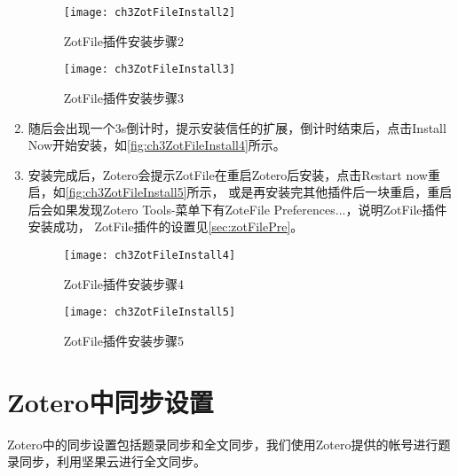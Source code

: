 \documentclass[cn,11pt,chinese]{elegantbook}
\begin{document}
\begin{enumerate}
			\begin{figure}[htbp]
				\begin{minipage}[t]{0.6\linewidth}
					\centering
					\texttt{[image: ch3ZotFileInstall2]}
					\caption{ZotFile插件安装步骤2}
					\label{fig:ch3ZotFileInstall2}
				\end{minipage}
				\begin{minipage}[t]{0.3\linewidth}
					\centering
					\texttt{[image: ch3ZotFileInstall3]}
					\caption{ZotFile插件安装步骤3}
					\label{fig:ch3ZotFileInstall3}
				\end{minipage}
			\end{figure}
			\item
			随后会出现一个3s倒计时，提示安装信任的扩展，倒计时结束后，点击Install Now开始安装，如\autoref{fig:ch3ZotFileInstall4}所示。
			\item
			安装完成后，Zotero会提示ZotFile在重启Zotero后安装，点击Restart now重启，如\autoref{fig:ch3ZotFileInstall5}所示，
			或是再安装完其他插件后一块重启，重启后会如果发现Zotero Tools-菜单下有ZoteFile Preferences...，说明ZotFile插件安装成功，
			ZotFile插件的设置见\cref{sec:zotFilePre}。
			\begin{figure}[htbp]
				\centering
				\texttt{[image: ch3ZotFileInstall4]}
				\caption{ZotFile插件安装步骤4}
				\label{fig:ch3ZotFileInstall4}
			\end{figure}
			
			\begin{figure}[htbp]
				\centering
				\texttt{[image: ch3ZotFileInstall5]}
				\caption{ZotFile插件安装步骤5}
				\label{fig:ch3ZotFileInstall5}
			\end{figure}
		\end{enumerate}
		
		\section{Zotero中同步设置}\label{sec:syn}
		Zotero中的同步设置包括题录同步和全文同步，我们使用Zotero提供的帐号进行题录同步，利用坚果云进行全文同步。
		
\end{document}
